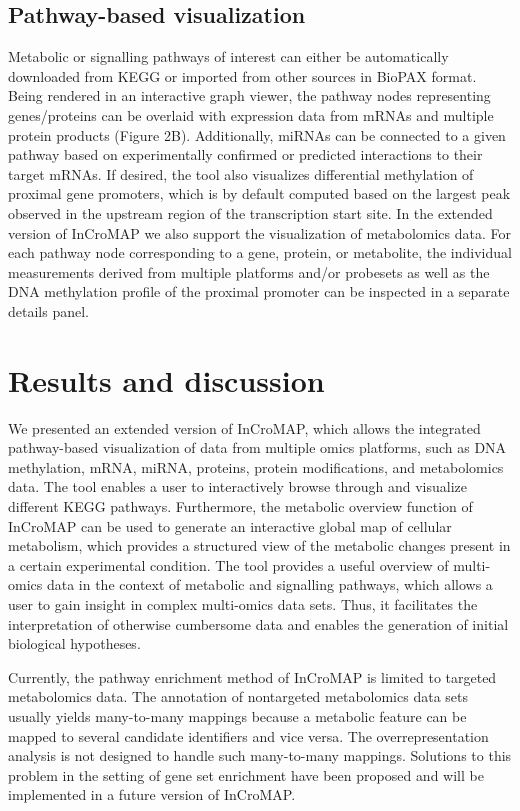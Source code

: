 \documentclass[final,5p,times,twocolumn]{elsarticle}
\begin{document}
\subsection{Pathway-based visualization}
Metabolic or signalling pathways of interest can either be automatically downloaded from KEGG or imported from other sources in BioPAX format. Being rendered in an interactive graph viewer, the pathway nodes representing genes/proteins can be overlaid with expression data from mRNAs and multiple protein products (Figure 2B). Additionally, miRNAs can be connected to a given pathway based on experimentally confirmed or predicted interactions to their target mRNAs. If desired, the tool also visualizes differential methylation of proximal gene promoters, which is by default computed based on the largest peak observed in the upstream region of the transcription start site. In the extended version of InCroMAP we also support the visualization of metabolomics data. For each pathway node corresponding to a gene, protein, or metabolite, the individual measurements derived from multiple platforms and/or probesets as well as the DNA methylation profile of the proximal promoter can be inspected in a separate details panel. 

\section{Results and discussion}
We presented an extended version of InCroMAP, which allows the integrated pathway-based visualization of data from multiple omics platforms, such as DNA methylation, mRNA, miRNA, proteins, protein modifications, and metabolomics data. The tool enables a user to interactively browse through and visualize different KEGG pathways. Furthermore, the metabolic overview function of InCroMAP can be used to generate an interactive global map of cellular metabolism, which provides a structured view of the metabolic changes present in a certain experimental condition. The tool provides a useful overview of multi-omics data in the context of metabolic and signalling pathways, which allows a user to gain insight in complex multi-omics data sets. Thus, it facilitates the interpretation of otherwise cumbersome data and enables the generation of initial biological hypotheses. 

Currently, the pathway enrichment method of InCroMAP is limited to targeted metabolomics data. The annotation of nontargeted metabolomics data sets usually yields many-to-many mappings because a metabolic feature can be mapped to several candidate identifiers and vice versa. The overrepresentation analysis is not designed to handle such many-to-many mappings. Solutions to this problem in the setting of gene set enrichment have been proposed \cite{Kankainen2011} and will be implemented in a future version of InCroMAP. 
\end{document}
